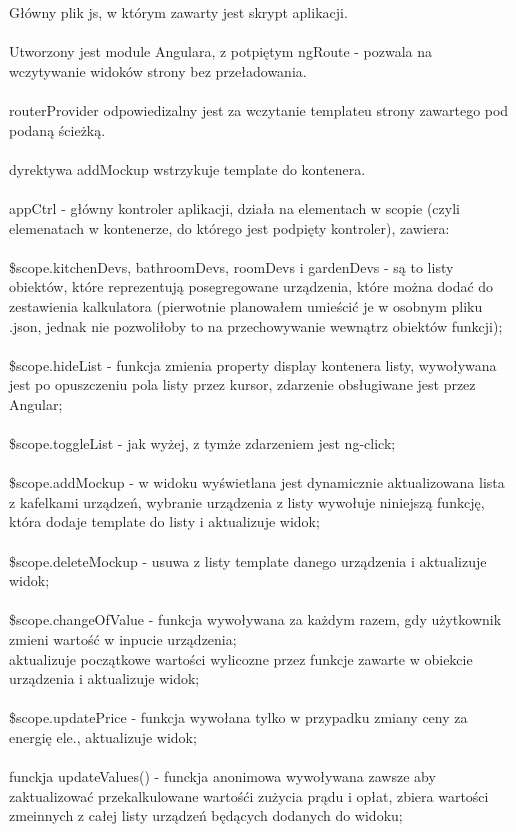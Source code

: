 \documentclass[a4paper]{article}
\begin{document}

{Główny plik js, w którym zawarty jest skrypt aplikacji. \\ \\
Utworzony jest module Angulara, z potpiętym ngRoute - pozwala na wczytywanie widoków strony bez przeładowania. \\ \\
routerProvider odpowiedizalny jest za wczytanie templateu strony zawartego pod podaną ścieżką. \\ \\
dyrektywa addMockup wstrzykuje template do kontenera. \\ \\
appCtrl - główny kontroler aplikacji, działa na elementach w scopie (czyli elemenatach w kontenerze, do którego jest podpięty kontroler), zawiera: \\ \\

\$scope.kitchenDevs, bathroomDevs, roomDevs i gardenDevs - są to listy obiektów, które reprezentują posegregowane urządzenia, które można dodać do zestawienia kalkulatora (pierwotnie planowałem umieścić je w osobnym pliku .json, jednak nie pozwoliłoby to na przechowywanie wewnątrz obiektów funkcji); \\ \\

\$scope.hideList - funkcja zmienia property display kontenera listy, wywoływana jest po opuszczeniu pola listy przez kursor, zdarzenie obsługiwane jest przez Angular; \\ \\

\$scope.toggleList - jak wyżej, z tymże zdarzeniem jest ng-click; \\ \\

\$scope.addMockup - w widoku wyświetlana jest dynamicznie aktualizowana lista z kafelkami urządzeń, wybranie urządzenia z listy wywołuje niniejszą funkcję, która dodaje template do listy i aktualizuje widok; \\ \\

\$scope.deleteMockup - usuwa z listy template danego urządzenia i aktualizuje widok; \\ \\

\$scope.changeOfValue - funkcja wywoływana za każdym razem, gdy użytkownik zmieni wartość w inpucie urządzenia; \\
aktualizuje początkowe wartości wylicozne przez funkcje zawarte w obiekcie urządzenia i aktualizuje widok; \\ \\

\$scope.updatePrice - funkcja wywołana tylko w przypadku zmiany ceny za energię ele., aktualizuje widok; \\ \\

funckja updateValues() - funckja anonimowa wywoływana zawsze aby zaktualizować przekalkulowane wartośći zużycia prądu i opłat, zbiera wartości zmeinnych z całej listy urządzeń będących dodanych do widoku;
}
\end{document}

